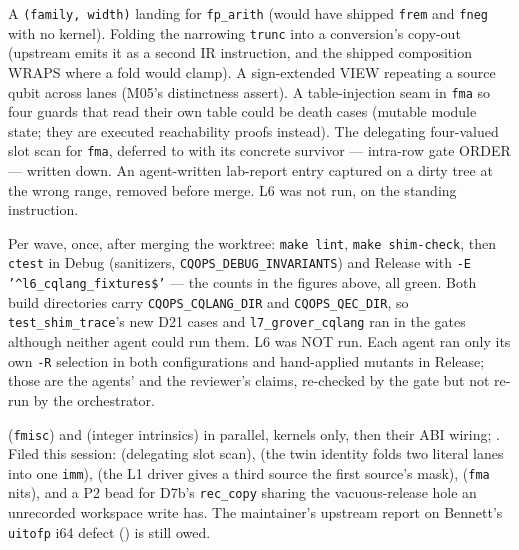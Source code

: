 A \texttt{(family, width)} landing for \texttt{fp\_arith} (would have shipped \texttt{frem} and \texttt{fneg}
with no kernel). Folding the narrowing \texttt{trunc} into a conversion's copy-out (upstream emits it as a
second IR instruction, and the shipped composition WRAPS where a fold would clamp). A sign-extended VIEW
repeating a source qubit across lanes (M05's distinctness assert). A table-injection seam in
\texttt{fma} so four guards that read their own table could be death cases (mutable module state; they are
executed reachability proofs instead). The delegating four-valued slot scan for \texttt{fma}, deferred to
 with its concrete survivor --- intra-row gate ORDER --- written down. An agent-written
lab-report entry captured on a dirty tree at the wrong range, removed before merge. L6 was not run, on the
standing instruction.

Per wave, once, after merging the worktree: \texttt{make lint}, \texttt{make shim-check}, then \texttt{ctest}
in Debug (sanitizers, \texttt{CQOPS\_DEBUG\_INVARIANTS}) and Release with
\texttt{-E '\^{}l6\_cqlang\_fixtures\$'} --- the counts in the figures above, all green. Both build
directories carry \texttt{CQOPS\_CQLANG\_DIR} and \texttt{CQOPS\_QEC\_DIR}, so \texttt{test\_shim\_trace}'s new
D21 cases and \texttt{l7\_grover\_cqlang} ran in the gates although neither agent could run them. L6 was NOT
run. Each agent ran only its own \texttt{-R} selection in both configurations and hand-applied mutants in
Release; those are the agents' and the reviewer's claims, re-checked by the gate but not re-run by the
orchestrator.

 (\texttt{fmisc}) and  (integer intrinsics) in parallel, kernels only, then their
ABI wiring; . Filed this session:  (delegating slot scan),  (the twin
identity folds two literal lanes into one \texttt{imm}),  (the L1 driver gives a third source
the first source's mask),  (\texttt{fma} nits), and a P2 bead for D7b's \texttt{rec\_copy}
sharing the vacuous-release hole an unrecorded workspace write has. The maintainer's upstream report on
Bennett's \texttt{uitofp} i64 defect () is still owed.

